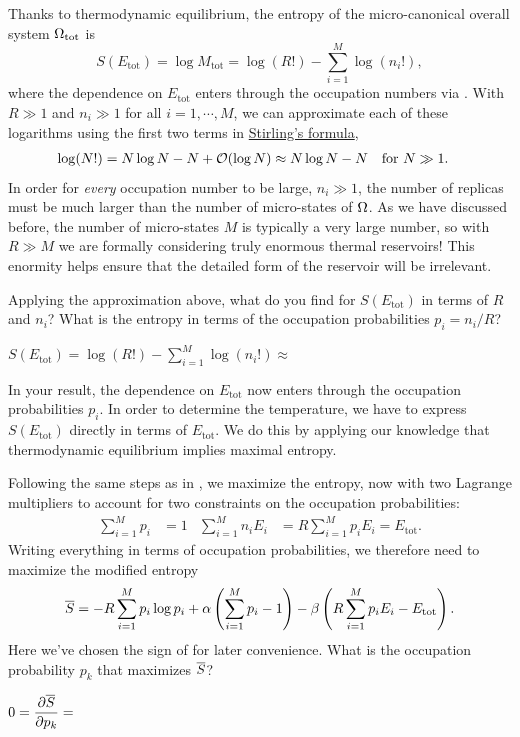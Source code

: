 Thanks to thermodynamic equilibrium, the entropy of the micro-canonical overall system $\Omega_{\text{tot}}$ is
\begin{equation*}
  S(E_{\text{tot}}) = \log M_{\text{tot}} = \log(R!) - \sum_{i = 1}^M \log(n_i!),
\end{equation*}
where the dependence on $E_{\text{tot}}$ enters through the occupation numbers via .
With $R \gg 1$ and $n_i \gg 1$ for all $i = 1, \cdots, M$, we can approximate each of these logarithms using the first two terms in \href{https://en.wikipedia.org/wiki/Stirling's_approximation}{Stirling's formula},
\begin{align*}
  \log(N!) & = N \log N - N + \mathcal O(\log N) \approx N \log N - N &
  \mbox{for } N & \gg 1.
\end{align*}
In order for \textit{every} occupation number to be large, $n_i \gg 1$, the number of replicas must be much larger than the number of micro-states of $\Omega$.
As we have discussed before, the number of micro-states $M$ is typically a very large number, so with $R \gg M$ we are formally considering truly enormous thermal reservoirs!
This enormity helps ensure that the detailed form of the reservoir will be irrelevant.

Applying the approximation above, what do you find for $S(E_{\text{tot}})$ in terms of $R$ and $n_i$?
What is the entropy in terms of the occupation probabilities $p_i = n_i / R$?
\begin{mdframed}
  $\displaystyle S(E_{\text{tot}}) = \log(R!) - \sum_{i = 1}^M \log(n_i!) \approx $ \\[100 pt]
\end{mdframed}

In your result, the dependence on $E_{\text{tot}}$ now enters through the occupation probabilities $p_i$.
In order to determine the temperature, we have to express $S(E_{\text{tot}})$ directly in terms of $E_{\text{tot}}$.
We do this by applying our knowledge that thermodynamic equilibrium implies maximal entropy.

Following the same steps as in , we maximize the entropy, now with two Lagrange multipliers to account for two constraints on the occupation probabilities:
\begin{align*}
  \sum_{i = 1}^M p_i & = 1 &
  \sum_{i = 1}^M n_i E_i & = R \sum_{i = 1}^M p_i E_i = E_{\text{tot}}.
\end{align*}
Writing everything in terms of occupation probabilities, we therefore need to maximize the modified entropy
\begin{equation*}
  \overline S = -R \sum_{i = 1}^M p_i \log p_i + \alpha\left(\sum_{i = 1}^M p_i - 1\right) - \beta\left(R \sum_{i = 1}^M p_i E_i - E_{\text{tot}}\right).
\end{equation*}
Here we've chosen the sign of \be for later convenience.
What is the occupation probability $p_k$ that maximizes $\overline S$?
\begin{mdframed}
  $\displaystyle 0 = \frac{\partial \overline S}{\partial p_k} = $ \\[100 pt] %
\end{mdframed}

